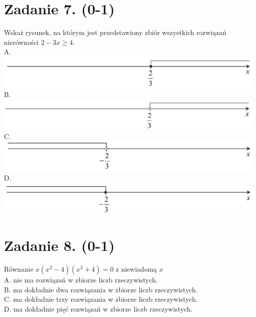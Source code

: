 \documentclass[10pt]{article}
\begin{document}
\section*{Zadanie 7. (0-1)}
Wskaż rysunek, na którym jest przedstawiony zbiór wszystkich rozwiązań nierówności \(2-3 x \geq 4\).\\
A.\\
\includegraphics[max width=\textwidth, center]{2024_11_21_7b5527312ea89ae66fd0g-04(2)}\\
B.\\
\includegraphics[max width=\textwidth, center]{2024_11_21_7b5527312ea89ae66fd0g-04(1)}\\
C.\\
\includegraphics[max width=\textwidth, center]{2024_11_21_7b5527312ea89ae66fd0g-04}\\
D.\\
\includegraphics[max width=\textwidth, center]{2024_11_21_7b5527312ea89ae66fd0g-04(3)}

\section*{Zadanie 8. (0-1)}
Równanie \(x\left(x^{2}-4\right)\left(x^{2}+4\right)=0\) z niewiadomą \(x\)\\
A. nie ma rozwiązań w zbiorze liczb rzeczywistych.\\
B. ma dokładnie dwa rozwiązania w zbiorze liczb rzeczywistych.\\
C. ma dokładnie trzy rozwiązania w zbiorze liczb rzeczywistych.\\
D. ma dokładnie pięć rozwiązań w zbiorze liczb rzeczywistych.
\end{document}
